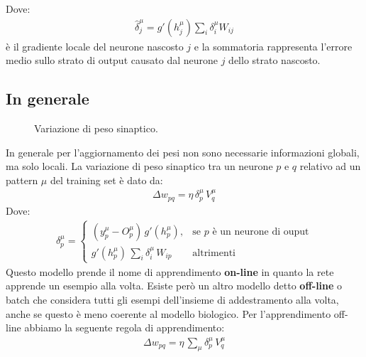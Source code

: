 Dove:
\begin{align*}
    \hat{\delta}_j^\mu = g'(h_j^\mu) \sum_i \delta^\mu_i W_{ij}
\end{align*}
è il gradiente locale del neurone nascosto $j$ e la sommatoria rappresenta l'errore medio sullo strato di output causato dal neurone $j$ dello strato nascosto.

\newpage

\subsection{In generale} %
\label{ssub:in_generale}
\begin{figure}[h!]
    \centering
    \caption{Variazione di peso sinaptico.}
\end{figure}

In generale per l'aggiornamento dei pesi non sono necessarie informazioni globali, ma solo locali. La variazione di peso sinaptico tra un neurone $p$ e $q$ relativo ad un pattern $\mu$ del training set è dato da:
\begin{align}
    \Delta w_{pq} = \eta \, \delta^\mu_p \, V^\mu_q
\end{align}
Dove:
\begin{align*}
    \delta_p^\mu =
    \begin{cases}
        (y^\mu_p - O^\mu_p) \, g'(h^\mu_p), &\text{se $p$ è un neurone di ouput} \\
        \displaystyle g'(h_p^\mu) \, \sum_i \delta^\mu_i \, W_{ip} &\text{altrimenti}
    \end{cases}
\end{align*}
Questo modello prende il nome di apprendimento \textbf{on-line} in quanto la rete apprende un esempio alla volta. Esiste però un altro modello detto \textbf{off-line} o batch che considera tutti gli esempi dell'insieme di addestramento alla volta, anche se questo è meno coerente al modello biologico. Per l'apprendimento off-line abbiamo la seguente regola di apprendimento:
\begin{align}
    \Delta w_{pq} = \eta \, \sum_\mu \delta^\mu_p \, V^\mu_q
\end{align}

